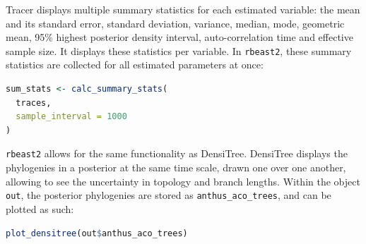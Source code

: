 \documentclass{article}
\begin{document}
Tracer displays multiple summary statistics for each
estimated variable: the mean and its standard error, standard deviation,
variance, median, mode, geometric mean, 95\% highest posterior density interval, 
auto-correlation time and effective sample size. It displays these statistics per
variable. In \verb;rbeast2;, these summary statistics are collected for
all estimated parameters at once: 

\begin{lstlisting}[language=R, floatplacement=H]
sum_stats <- calc_summary_stats(
  traces, 
  sample_interval = 1000
)
\end{lstlisting}

\verb;rbeast2; allows for the same functionality as DensiTree.
DensiTree displays the phylogenies in a posterior at the same
time scale, drawn one over one another, allowing to see the uncertainty in
topology and branch lengths. Within the object \verb;out;, 
the posterior phylogenies are stored as \verb;anthus_aco_trees;,
and can be plotted as such:

\begin{lstlisting}[language=R, floatplacement=H]
plot_densitree(out$anthus_aco_trees)
\end{lstlisting}
\end{document}
